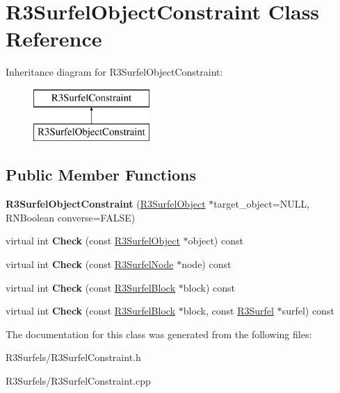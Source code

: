 \hypertarget{class_r3_surfel_object_constraint}{}\section{R3\+Surfel\+Object\+Constraint Class Reference}
\label{class_r3_surfel_object_constraint}
Inheritance diagram for R3\+Surfel\+Object\+Constraint\+:\begin{figure}[H]
\begin{center}
\leavevmode
\includegraphics[height=2.000000cm]{class_r3_surfel_object_constraint}
\end{center}
\end{figure}
\subsection*{Public Member Functions}
\begin{DoxyCompactItemize}
\item 
{\bfseries R3\+Surfel\+Object\+Constraint} (\hyperlink{class_r3_surfel_object}{R3\+Surfel\+Object} $\ast$target\+\_\+object=N\+U\+LL, R\+N\+Boolean converse=F\+A\+L\+SE)\hypertarget{class_r3_surfel_object_constraint_ab1138b39986f91941dc3f2478036519b}{}\label{class_r3_surfel_object_constraint_ab1138b39986f91941dc3f2478036519b}

\item 
virtual int {\bfseries Check} (const \hyperlink{class_r3_surfel_object}{R3\+Surfel\+Object} $\ast$object) const \hypertarget{class_r3_surfel_object_constraint_a51c91233a12d115d56094ada78cc54b3}{}\label{class_r3_surfel_object_constraint_a51c91233a12d115d56094ada78cc54b3}

\item 
virtual int {\bfseries Check} (const \hyperlink{class_r3_surfel_node}{R3\+Surfel\+Node} $\ast$node) const \hypertarget{class_r3_surfel_object_constraint_a7df672b36a03e5ae88c227f09c54b5bd}{}\label{class_r3_surfel_object_constraint_a7df672b36a03e5ae88c227f09c54b5bd}

\item 
virtual int {\bfseries Check} (const \hyperlink{class_r3_surfel_block}{R3\+Surfel\+Block} $\ast$block) const \hypertarget{class_r3_surfel_object_constraint_a0d3909371a685f5b613f40f392218da2}{}\label{class_r3_surfel_object_constraint_a0d3909371a685f5b613f40f392218da2}

\item 
virtual int {\bfseries Check} (const \hyperlink{class_r3_surfel_block}{R3\+Surfel\+Block} $\ast$block, const \hyperlink{class_r3_surfel}{R3\+Surfel} $\ast$surfel) const \hypertarget{class_r3_surfel_object_constraint_a394179a6ea25b3bbbf90d36f48148725}{}\label{class_r3_surfel_object_constraint_a394179a6ea25b3bbbf90d36f48148725}

\end{DoxyCompactItemize}


The documentation for this class was generated from the following files\+:\begin{DoxyCompactItemize}
\item 
R3\+Surfels/R3\+Surfel\+Constraint.\+h\item 
R3\+Surfels/R3\+Surfel\+Constraint.\+cpp\end{DoxyCompactItemize}
